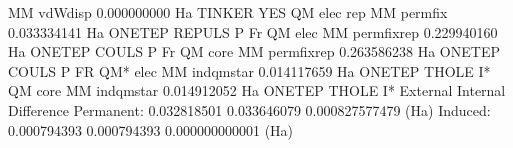 \documentclass[letterpaper,10pt,english]{sphinxmanual}
\begin{document}
\begin{sphinxVerbatim}[commandchars=\\\{\}]
\textbar{} \PYGZhy{} MM vdW\PYGZhy{}disp                        0.000000000 Ha  TINKER      YES         \textbar{}
\textbar{} \PYGZhy{} QM elec \PYGZlt{}\PYGZhy{}\PYGZgt{} rep MM perm\PYGZus{}fix        0.033334141 Ha  ONETEP   REPULS  P Fr   \textbar{}
\textbar{} \PYGZhy{} QM elec \PYGZlt{}\PYGZhy{}\PYGZgt{} MM perm\PYGZus{}fix\PYGZus{}rep        0.229940160 Ha  ONETEP   COUL\PYGZhy{}S  P Fr   \textbar{}
\textbar{} \PYGZhy{} QM core \PYGZlt{}\PYGZhy{}\PYGZgt{} MM perm\PYGZus{}fix\PYGZus{}rep       \PYGZhy{}0.263586238 Ha  ONETEP   COUL\PYGZhy{}S  P FR   \textbar{}
\textbar{} \PYGZhy{} QM* elec \PYGZlt{}\PYGZhy{}\PYGZgt{} MM ind\PYGZus{}qmstar         0.014117659 Ha  ONETEP    THOLE  I*     \textbar{}
\textbar{} \PYGZhy{} QM core \PYGZlt{}\PYGZhy{}\PYGZgt{} MM ind\PYGZus{}qmstar         \PYGZhy{}0.014912052 Ha  ONETEP    THOLE  I*     \textbar{}
\textbar{}\PYGZhy{}\PYGZhy{}\PYGZhy{}\PYGZhy{}\PYGZhy{}\PYGZhy{}\PYGZhy{}\PYGZhy{}\PYGZhy{}\PYGZhy{}\PYGZhy{}\PYGZhy{}\PYGZhy{}\PYGZhy{}\PYGZhy{}\PYGZhy{}\PYGZhy{}\PYGZhy{}\PYGZhy{}\PYGZhy{}\PYGZhy{}\PYGZhy{}\PYGZhy{}\PYGZhy{}\PYGZhy{}\PYGZhy{}\PYGZhy{}\PYGZhy{}\PYGZhy{}\PYGZhy{}\PYGZhy{}\PYGZhy{}\PYGZhy{}\PYGZhy{}\PYGZhy{}\PYGZhy{}\PYGZhy{}\PYGZhy{}\PYGZhy{}\PYGZhy{}\PYGZhy{}\PYGZhy{}\PYGZhy{}\PYGZhy{}\PYGZhy{}\PYGZhy{}\PYGZhy{}\PYGZhy{}\PYGZhy{}\PYGZhy{}\PYGZhy{}\PYGZhy{}\PYGZhy{}\PYGZhy{}\PYGZhy{}\PYGZhy{}\PYGZhy{}\PYGZhy{}\PYGZhy{}\PYGZhy{}\PYGZhy{}\PYGZhy{}\PYGZhy{}\PYGZhy{}\PYGZhy{}\PYGZhy{}\PYGZhy{}\PYGZhy{}\PYGZhy{}\PYGZhy{}\PYGZhy{}\PYGZhy{}\PYGZhy{}\PYGZhy{}\PYGZhy{}\PYGZhy{}\PYGZhy{}\PYGZhy{}\textbar{}
\textbar{}                      External \textbar{}           Internal \textbar{}         Difference      \textbar{}
\textbar{} Permanent:       \PYGZhy{}0.032818501 \textbar{}       \PYGZhy{}0.033646079 \textbar{}     0.000827577479 (Ha) \textbar{}
\textbar{} Induced:         \PYGZhy{}0.000794393 \textbar{}       \PYGZhy{}0.000794393 \textbar{}    \PYGZhy{}0.000000000001 (Ha) \textbar{}
\textbar{}\PYGZhy{}\PYGZhy{}\PYGZhy{}\PYGZhy{}\PYGZhy{}\PYGZhy{}\PYGZhy{}\PYGZhy{}\PYGZhy{}\PYGZhy{}\PYGZhy{}\PYGZhy{}\PYGZhy{}\PYGZhy{}\PYGZhy{}\PYGZhy{}\PYGZhy{}\PYGZhy{}\PYGZhy{}\PYGZhy{}\PYGZhy{}\PYGZhy{}\PYGZhy{}\PYGZhy{}\PYGZhy{}\PYGZhy{}\PYGZhy{}\PYGZhy{}\PYGZhy{}\PYGZhy{}\PYGZhy{}\PYGZhy{}\PYGZhy{}\PYGZhy{}\PYGZhy{}\PYGZhy{}\PYGZhy{}\PYGZhy{}\PYGZhy{}\PYGZhy{}\PYGZhy{}\PYGZhy{}\PYGZhy{}\PYGZhy{}\PYGZhy{}\PYGZhy{}\PYGZhy{}\PYGZhy{}\PYGZhy{}\PYGZhy{}\PYGZhy{}\PYGZhy{}\PYGZhy{}\PYGZhy{}\PYGZhy{}\PYGZhy{}\PYGZhy{}\PYGZhy{}\PYGZhy{}\PYGZhy{}\PYGZhy{}\PYGZhy{}\PYGZhy{}\PYGZhy{}\PYGZhy{}\PYGZhy{}\PYGZhy{}\PYGZhy{}\PYGZhy{}\PYGZhy{}\PYGZhy{}\PYGZhy{}\PYGZhy{}\PYGZhy{}\PYGZhy{}\PYGZhy{}\PYGZhy{}\PYGZhy{}\textbar{}

\end{sphinxVerbatim}
\end{document}
